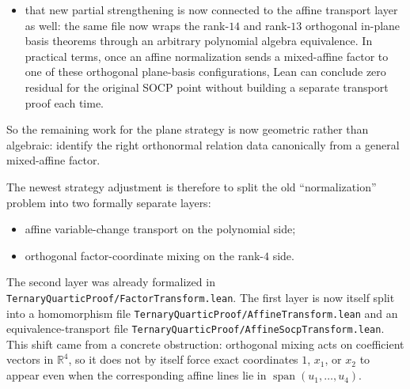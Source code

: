 \documentclass[11pt]{article}
\begin{document}
\begin{itemize}
  bookkeeping for products of general linear forms and remains reverted. But a
  cleaner partial theorem is now formalized: if the quadratic relations differ
  from the monomial pairs $(x_1x_2,x_2^2)$ or $(x_1^2,x_1x_2)$ by an orthogonal
  $2 \times 2$ basis change inside that plane, then Lean reconstructs the
  exact monomial relations and reduces back to the existing rank-$14$ or
  rank-$13$ mixed-affine theorem. So the obstruction has narrowed from
  ``arbitrary plane-basis algebra'' to ``produce orthogonal in-plane basis
  data from a general mixed-affine factor.''
\item that new partial strengthening is now connected to the affine transport
  layer as well: the same file now wraps the rank-$14$ and rank-$13$ orthogonal
  in-plane basis theorems through an arbitrary polynomial algebra equivalence.
  In practical terms, once an affine normalization sends a mixed-affine factor
  to one of these orthogonal plane-basis configurations, Lean can conclude
  zero residual for the original SOCP point without building a separate
  transport proof each time.
\end{itemize}
So the remaining work for the plane strategy is now geometric rather than
algebraic: identify the right orthonormal relation data canonically from a
general mixed-affine factor.

The newest strategy adjustment is therefore to split the old ``normalization''
problem into two formally separate layers:
\begin{itemize}
\item affine variable-change transport on the polynomial side;
\item orthogonal factor-coordinate mixing on the rank-$4$ side.
\end{itemize}
The second layer was already formalized in
\texttt{TernaryQuarticProof/FactorTransform.lean}. The first layer is now
itself split into a homomorphism file
\texttt{TernaryQuarticProof/AffineTransform.lean} and an equivalence-transport
file \texttt{TernaryQuarticProof/AffineSocpTransform.lean}. This shift came
from a concrete obstruction: orthogonal mixing acts on coefficient vectors in
$\mathbb{R}^4$, so it does not by itself force exact coordinates $1$, $x_1$,
or $x_2$ to appear even when the corresponding affine lines lie in
$\operatorname{span}(u_1,\dots,u_4)$.
\end{document}
